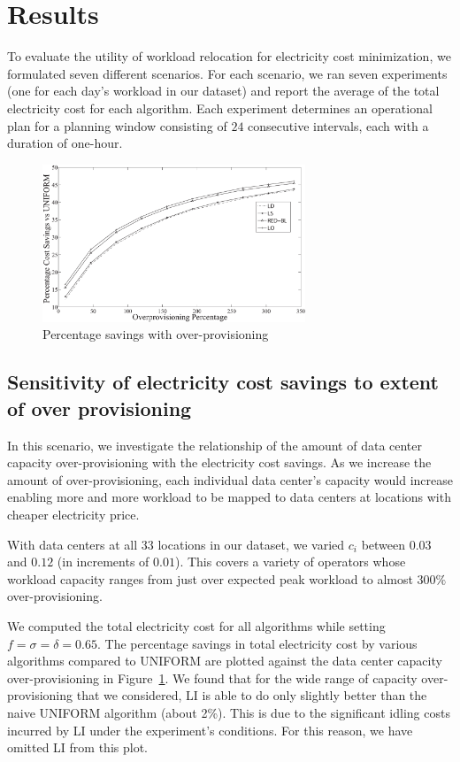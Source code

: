 \section{Results}
To evaluate the utility of workload relocation for electricity cost minimization, we
formulated seven different scenarios. For each scenario, we ran
seven experiments (one for each day's workload in our dataset) and report the average of the total electricity cost for each algorithm. Each experiment determines an operational plan for a planning window consisting of $24$ consecutive intervals, each with a duration of one-hour.

\begin{figure}
\centering
\includegraphics[width=0.7\textwidth]{pics/s1vseqr.eps}
    \caption{Percentage savings with over-provisioning}
    \label{fig:s1r}
\end{figure}

\subsection{Sensitivity of electricity cost savings to extent of over provisioning}In this scenario, we investigate the relationship of the amount of data center capacity over-provisioning with the electricity cost savings. As we increase the amount of over-provisioning, each individual data center's capacity would increase enabling more and more workload to be mapped to data centers at locations with cheaper electricity price.

With data centers at all
    $33$ locations in our dataset, we varied $c_i$ between $0.03$ and
    $0.12$ (in increments of $0.01$). This covers a variety of operators whose workload capacity ranges from just over expected peak workload to
almost $300\%$ over-provisioning.

We computed the total electricity cost for all algorithms while setting $f=\sigma=\delta=0.65$. The percentage savings in total electricity cost by various algorithms compared to UNIFORM are plotted against the data center capacity over-provisioning in Figure~\ref{fig:s1r}. We found that for the wide range of capacity over-provisioning that we considered, LI is able to do only slightly better than the naive UNIFORM algorithm (about 2\%). This is due to the significant idling costs incurred by LI under the experiment's conditions. For this reason, we have omitted LI from this plot.

